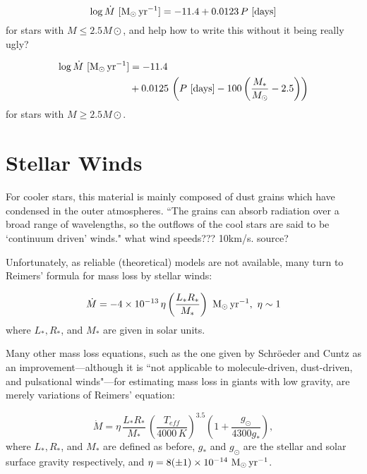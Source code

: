 \documentclass[a4paper,11pt,twocolumn]{article}
\begin{document}
\begin{equation*}
    \log \dot M~{[\rm M_\odot\,yr^{-1}]} = -11.4 + 0.0123\,P~{[\rm days]}
\end{equation*}
for stars with $M\leq 2.5M\odot$, and {\huge help how to write this without it being really ugly?}

\begin{align*}
    \log \dot M~{[\rm M_\odot\,yr^{-1}]} &= -11.4 \\
                                         &+ 0.0125\,\left(P~{[\rm days]} - 100\left(\frac{M_*}{M_\odot} - 2.5\right)\right)
\end{align*}
for stars with $M\geq 2.5M\odot$. 


\section{Stellar Winds}

For cooler stars, this material is mainly composed of dust grains which have condensed in the outer atmospheres. ``The grains can absorb radiation over a broad range of wavelengths, so the outflows of the cool stars are said to be ‘continuum driven’ winds." \cite{lamers} {\huge what wind speeds??? 10km/s. source?}

Unfortunately, as reliable (theoretical) models are not available, many turn to Reimers' formula \cite{reimers} for mass loss by stellar winds:

\begin{equation*}
    \dot M = -4\times 10^{-13}\,\eta \left(\frac{L_*R_*}{M_*}\right)~{\rm M_\odot\,yr^{-1}},~{\rm \eta \sim 1}
\end{equation*}
where $L_*, R_*$, and $M_*$ are given in solar units. 

Many other mass loss equations, such as the one given by Schröeder and Cuntz \cite{schroeder} as an improvement—although it is ``not applicable to molecule-driven, dust-driven, and pulsational winds"—for estimating mass loss in giants with low gravity, are merely variations of Reimers' equation:

\begin{equation*}
    \dot M = \eta\,\frac{L_*R_*}{M_*}\,\left(\frac{T_{eff}}{4000\,K}\right)^{3.5}\left(1+\frac{g_\odot}{4300g_*}\right),
\end{equation*}
where $L_*, R_*$, and $M_*$ are defined as before, $g_*$ and $g_\odot$ are the stellar and solar surface gravity respectively, and $\eta = 8 (\pm 1) \times 10^{-14}~{\rm M_\odot\,yr^{-1}}$.
\end{document}
